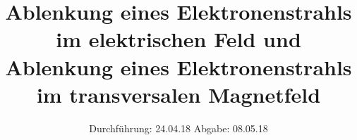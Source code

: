 

\subject{V501 und V502}
\title{Ablenkung eines Elektronenstrahls im elektrischen Feld und Ablenkung eines Elektronenstrahls im transversalen Magnetfeld}
\date{
  Durchführung: 24.04.18
  \hspace{3em}
  Abgabe: 08.05.18
}



\maketitle
\thispagestyle{empty}
\tableofcontents
\newpage









\newpage
\printbibliography



